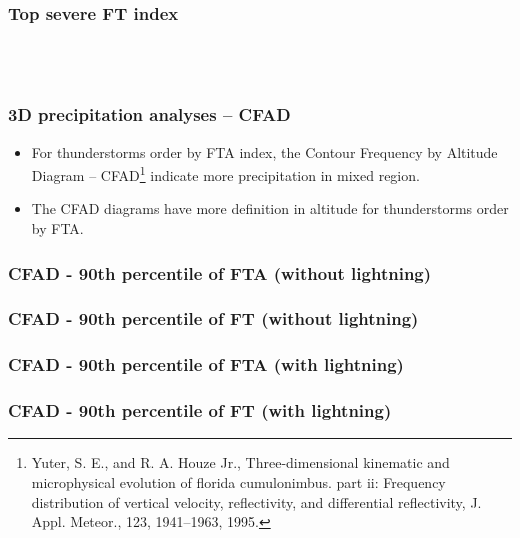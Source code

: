 \documentclass[smaller]{beamer}
\begin{document}
\begin{frame}
\frametitle{Top severe FT index}
~~
\\
\\

\end{frame}




\begin{frame}
\frametitle{3D precipitation analyses -- CFAD}
\begin{itemize}

\item For thunderstorms order by FTA index, the Contour Frequency by Altitude Diagram -- CFAD\footnote{Yuter, S. E., and R. A. Houze Jr., Three-dimensional kinematic and microphysical evolution of florida cumulonimbus.
part ii: Frequency distribution of vertical velocity, reflectivity, and differential reflectivity, J. Appl. Meteor., 123,
1941–1963, 1995.} indicate more precipitation in mixed region.
\item The CFAD diagrams have more definition in altitude for thunderstorms order by FTA.
\end{itemize}
\end{frame}
  
\begin{frame}
\frametitle{CFAD - 90th percentile of FTA (without lightning)}

\end{frame}

\begin{frame}
\frametitle{CFAD - 90th percentile of FT (without lightning)}

\end{frame}

\begin{frame}
\frametitle{CFAD - 90th percentile of FTA (with lightning) }

\end{frame}

\begin{frame}
\frametitle{CFAD - 90th percentile of FT (with lightning)}

\end{frame}
\end{document}
